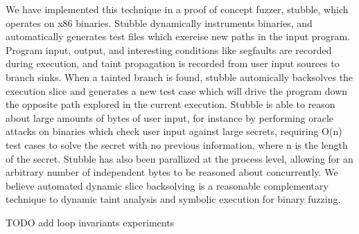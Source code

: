 \documentclass[11pt,expanded,copyright]{fsuthesis}
\begin{document}
We have implemented this technique in a proof of concept fuzzer, stubble, which operates on x86 binaries. Stubble dynamically instruments binaries, and automatically generates test files which exercise new paths in the input program. Program input, output, and interesting conditions like segfaults are recorded during execution, and taint propagation is recorded from user input sources to branch sinks. When a tainted branch is found, stubble automically backsolves the execution slice and generates a new test case which will drive the program down the opposite path explored in the current execution. Stubble is able to reason about large amounts of bytes of user input, for instance by performing oracle attacks on binaries which check user input against large secrets, requiring O(n) test cases to solve the secret with no previous information, where n is the length of the secret. Stubble has also been parallized at the process level, allowing for an arbitrary number of independent bytes to be reasoned about concurrently. We believe automated dynamic slice backsolving is a reasonable complementary technique to dynamic taint analysis and symbolic execution for binary fuzzing.

TODO add loop invariants experiments


 


\end{document}

